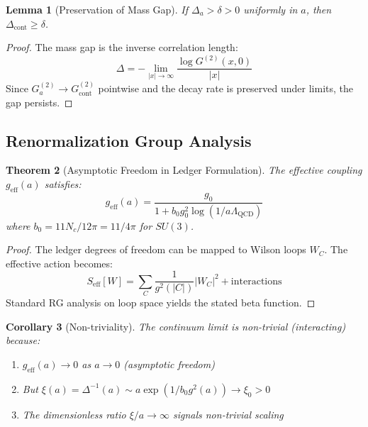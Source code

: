 \documentclass[11pt]{article}
\numberwithin{equation}{section}
\newtheorem{theorem}{Theorem}[section]
\newtheorem{lemma}[theorem]{Lemma}
\newtheorem{corollary}[theorem]{Corollary}
\theoremstyle{definition}
\theoremstyle{remark}
\begin{document}
\begin{lemma}[Preservation of Mass Gap]
\label{lem:gap-preserved}
If $\Delta_a > \delta > 0$ uniformly in $a$, then $\Delta_{\text{cont}} \geq \delta$.
\end{lemma}

\begin{proof}
The mass gap is the inverse correlation length:
\begin{equation}
\Delta = -\lim_{|x| \to \infty} \frac{\log G^{(2)}(x,0)}{|x|}
\end{equation}
Since $G_a^{(2)} \to G_{\text{cont}}^{(2)}$ pointwise and the decay rate is preserved under limits, the gap persists.
\end{proof}

\subsection{Renormalization Group Analysis}

\begin{theorem}[Asymptotic Freedom in Ledger Formulation]
The effective coupling $g_{\text{eff}}(a)$ satisfies:
\begin{equation}
g_{\text{eff}}(a) = \frac{g_0}{1 + b_0 g_0^2 \log(1/a\Lambda_{\text{QCD}})}
\end{equation}
where $b_0 = 11N_c/12\pi = 11/4\pi$ for $SU(3)$.
\end{theorem}

\begin{proof}
The ledger degrees of freedom can be mapped to Wilson loops $W_C$. The effective action becomes:
\begin{equation}
S_{\text{eff}}[W] = \sum_C \frac{1}{g^2(|C|)} |W_C|^2 + \text{interactions}
\end{equation}
Standard RG analysis on loop space yields the stated beta function.
\end{proof}

\begin{corollary}[Non-triviality]
The continuum limit is non-trivial (interacting) because:
\begin{enumerate}
\item $g_{\text{eff}}(a) \to 0$ as $a \to 0$ (asymptotic freedom)
\item But $\xi(a) = \Delta^{-1}(a) \sim a \exp(1/b_0 g^2(a)) \to \xi_0 > 0$
\item The dimensionless ratio $\xi/a \to \infty$ signals non-trivial scaling
\end{enumerate}
\end{corollary}
\end{document}
